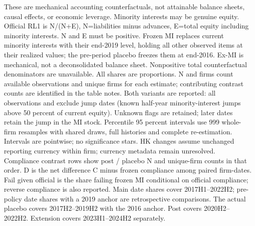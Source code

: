 \begin{table}[!htbp]
\begin{threeparttable}
\begin{tablenotes}[flushleft]
\item[] These are mechanical accounting counterfactuals, not attainable balance sheets, causal effects, or economic leverage. Minority interests may be genuine equity. Official RL1 is N/(N+E), N=liabilities minus advances, E=total equity including minority interests. N and E must be positive. Frozen MI replaces current minority interests with their end-2019 level, holding all other observed items at their realized values; the pre-period placebo freezes them at end-2016. Ex-MI is mechanical, not a deconsolidated balance sheet. Nonpositive total counterfactual denominators are unavailable. All shares are proportions. N and firms count available observations and unique firms for each estimate; contributing contrast counts are identified in the table notes. Both variants are reported: all observations and exclude jump dates (known half-year minority-interest jumps above 50 percent of current equity). Unknown flags are retained; later dates retain the jump in the MI stock. Percentile 95 percent intervals use 999 whole-firm resamples with shared draws, full histories and complete re-estimation. Intervals are pointwise; no significance stars. HK changes assume unchanged reporting currency within firm; currency metadata remain unresolved. Compliance contrast rows show post / placebo N and unique-firm counts in that order. D is the net difference C minus frozen compliance among paired firm-dates. Fail given official is the share failing frozen MI conditional on official compliance; reverse compliance is also reported. Main date shares cover 2017H1--2022H2; pre-policy date shares with a 2019 anchor are retrospective comparisons. The actual placebo covers 2017H2--2019H2 with the 2016 anchor. Post covers 2020H2--2022H2. Extension covers 2023H1--2024H2 separately.
\end{tablenotes}
\end{threeparttable}
\end{table}

